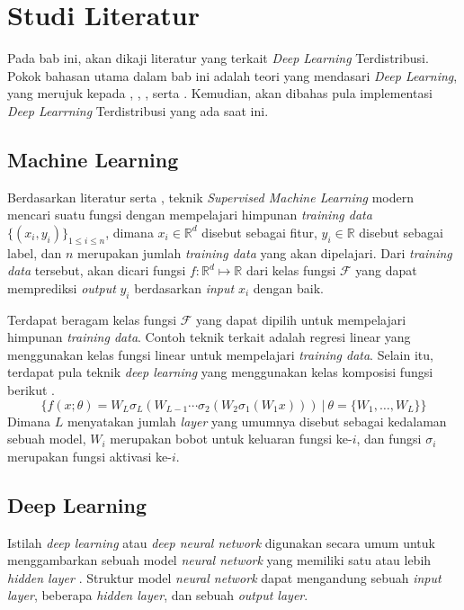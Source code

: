 \chapter{Studi Literatur}
Pada bab ini, akan dikaji literatur yang terkait \emph{Deep Learning} Terdistribusi. Pokok bahasan utama dalam bab ini adalah teori yang mendasari \emph{Deep Learning}, yang merujuk kepada \textcite{JiangDistributed}, \textcite{Choi2019}, \textcite{Fan2019}, serta \textcite{LeCun2015}. Kemudian, akan dibahas pula implementasi \emph{Deep Learrning} Terdistribusi yang ada saat ini.

\section{Machine Learning}
Berdasarkan literatur \textcite{Fan2019} serta \textcite{bishop2006pattern}, teknik \emph{Supervised Machine Learning} modern mencari suatu fungsi dengan mempelajari himpunan \emph{training data} $\{(x_i, y_i)\}_{1 \le i \le n}$, dimana $x_i \in \mathbb{R}^d$ disebut sebagai fitur,  $y_i \in \mathbb{R}$ disebut sebagai label, dan $n$ merupakan jumlah \emph{training data} yang akan dipelajari. Dari \emph{training data} tersebut, akan dicari fungsi $f: \mathbb{R}^d \mapsto \mathbb{R}$ dari kelas fungsi $\mathcal{F}$ yang dapat memprediksi \emph{output} $y_i$ berdasarkan \emph{input} $x_i$ dengan baik.

Terdapat beragam kelas fungsi \(\mathcal{F}\) yang dapat dipilih untuk mempelajari himpunan \emph{training data}. Contoh teknik terkait adalah regresi linear yang menggunakan kelas fungsi linear untuk mempelajari \emph{training data}. Selain itu, terdapat pula teknik \emph{deep learning} yang menggunakan kelas komposisi fungsi berikut \parencite{LeCun2015}.
\begin{equation}
  \{
  f(x;\theta) = W_L\sigma_L(W_{L-1} \cdots \sigma_2(W_2\sigma_1(W_1 x)))\ \vert \ \theta = \{W_1,\dots,W_L\}
  \}
\end{equation}
Dimana $L$ menyatakan jumlah \emph{layer} yang umumnya disebut sebagai kedalaman sebuah model, $W_i$ merupakan bobot untuk keluaran fungsi ke-$i$, dan fungsi $\sigma_i$ merupakan fungsi aktivasi ke-$i$.

\section{Deep Learning}
Istilah \emph{deep learning} atau \emph{deep neural network} digunakan secara umum untuk menggambarkan sebuah model \emph{neural network} yang memiliki satu atau lebih \emph{hidden layer} \parencite{Fan2019,LeCun2015}. Struktur model \emph{neural network} dapat mengandung sebuah \emph{input layer}, beberapa \emph{hidden layer}, dan sebuah \emph{output layer}.

